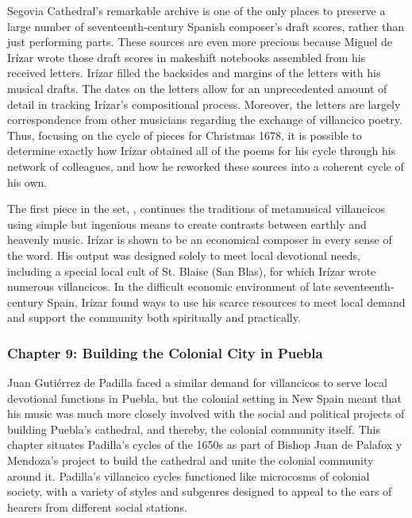 \documentclass[tt]{vcbook-proposal}
\begin{document}
Segovia Cathedral's remarkable archive is one of the only places to preserve a large number of seventeenth-century Spanish composer's draft scores, rather than just performing parts.
These sources are even more precious because Miguel de Irízar wrote those draft scores in makeshift notebooks assembled from his received letters.
Irízar filled the backsides and margins of the letters with his musical drafts.
The dates on the letters allow for an unprecedented amount of detail in tracking Irízar's compositional process.
Moreover, the letters are largely correspondence from other musicians regarding the exchange of villancico poetry.
Thus, focusing on the cycle of pieces for Christmas 1678, it is possible to determine exactly how Irízar obtained all of the poems for his cycle through his network of colleagues, and how he reworked these sources into a coherent cycle of his own.

The first piece in the set, , continues the traditions of metamusical villancicos using simple but ingenious means to create contrasts between earthly and heavenly music.
Irízar is shown to be an economical composer in every sense of the word.
His output was designed solely to meet local devotional needs, including a special local cult of St. Blaise (San Blas), for which Irízar wrote numerous villancicos. 
In the difficult economic environment of late seventeenth-century Spain, Irízar found ways to use his scarce resources to meet local demand and support the community both spiritually and practically.

\subsubsection{Chapter 9: Building the Colonial City in Puebla}

Juan Gutiérrez de Padilla faced a similar demand for villancicos to serve local devotional functions in Puebla, but the colonial setting in New Spain meant that his music was much more closely involved with the social and political projects of building Puebla's cathedral, and thereby, the colonial community itself.
This chapter situates Padilla's cycles of the 1650s as part of Bishop Juan de Palafox y Mendoza's project to build the cathedral and unite the colonial community around it.
Padilla's villancico cycles functioned like microcosms of colonial society, with a variety of styles and subgenres designed to appeal to the ears of hearers from different social stations.
\end{document}
